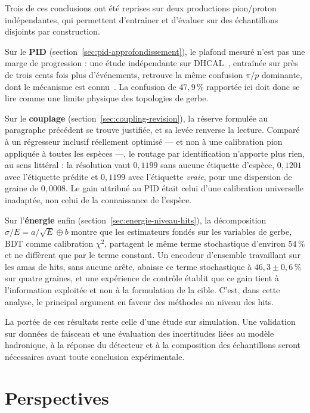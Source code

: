 Trois de ces conclusions ont été reprises sur deux productions pion/proton indépendantes, qui permettent d'entraîner et d'évaluer sur des échantillons disjoints par construction.

Sur le \textbf{PID} (section~\ref{sec:pid-approfondissement}), le plafond mesuré n'est pas une marge de progression : une étude indépendante sur DHCAL~\cite{borysova2025dhcalgnn}, entraînée sur près de trois cents fois plus d'événements, retrouve la même confusion $\pi/p$ dominante, dont le mécanisme est connu~\cite{akchurin1998proton}. La confusion de $47{,}9\,\%$ rapportée ici doit donc se lire comme une limite physique des topologies de gerbe.

Sur le \textbf{couplage} (section~\ref{sec:coupling-revision}), la réserve formulée au paragraphe précédent se trouve justifiée, et sa levée renverse la lecture. Comparé à un régresseur inclusif réellement optimisé — et non à une calibration pion appliquée à toutes les espèces —, le routage par identification n'apporte plus rien, au sens littéral : la résolution vaut $0{,}1199$ sans aucune étiquette d'espèce, $0{,}1201$ avec l'étiquette prédite et $0{,}1199$ avec l'étiquette \emph{vraie}, pour une dispersion de graine de $0{,}0008$. Le gain attribué au PID était celui d'une calibration universelle inadaptée, non celui de la connaissance de l'espèce.

Sur l'\textbf{énergie} enfin (section~\ref{sec:energie-niveau-hits}), la décomposition $\sigma/E = a/\sqrt{E} \oplus b$ montre que les estimateurs fondés sur les variables de gerbe, BDT comme calibration $\chi^2$, partagent le même terme stochastique d'environ $54\,\%$ et ne diffèrent que par le terme constant. Un encodeur d'ensemble travaillant sur les amas de hits, sans aucune arête, abaisse ce terme stochastique à $46{,}3 \pm 0{,}6\,\%$ sur quatre graines, et une expérience de contrôle établit que ce gain tient à l'information exploitée et non à la formulation de la cible. C'est, dans cette analyse, le principal argument en faveur des méthodes au niveau des hits.

La portée de ces résultats reste celle d'une étude sur simulation. Une validation sur données de faisceau et une évaluation des incertitudes liées au modèle hadronique, à la réponse du détecteur et à la composition des échantillons seront nécessaires avant toute conclusion expérimentale.

\chapter*{Perspectives}
{}

